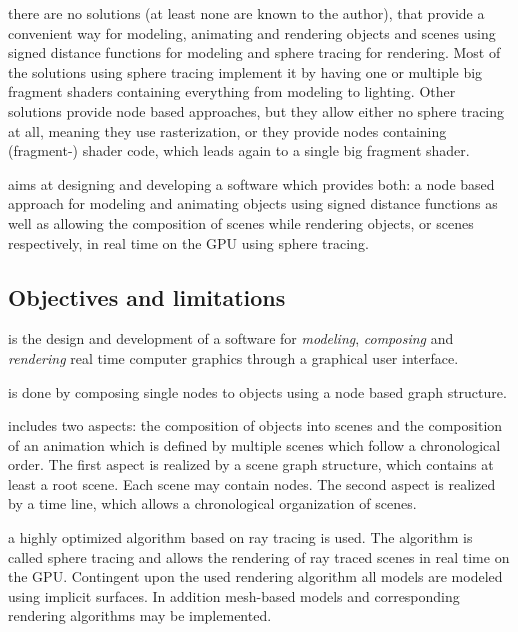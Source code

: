 \documentclass[%
    a4paper,    %
    justified,  %
    nobib,      %
    openany     %
]{tufte-book}
\begin{document}
 there are no solutions (at least none are
known to the author), that provide a convenient way for modeling, animating and
rendering objects and scenes using signed distance functions for modeling and
sphere tracing for rendering.
Most of the solutions using sphere tracing implement it by having one or
multiple big fragment shaders containing everything from modeling to lighting.
Other solutions provide node based approaches, but they allow either no sphere
tracing at all, meaning they use rasterization, or they provide nodes containing
(fragment-) shader code, which leads again to a single big fragment shader.

 aims at designing and developing a software which
provides both: a node based approach for modeling and animating objects using
signed distance functions as well as allowing the composition of scenes while
rendering objects, or scenes respectively, in real time on the GPU using sphere
tracing.

\subsection{Objectives and limitations}
\label{subsec:objectives}

 is the design and development of a
software for \textit{modeling}, \textit{composing} and \textit{rendering} real
time computer graphics through a graphical user interface.

 is done by composing single nodes to objects using a
node based graph structure.

 includes two aspects: the composition of objects into
scenes and the composition of an animation which is defined by multiple scenes
which follow a chronological order. The first aspect is realized by a scene
graph structure, which contains at least a root scene. Each scene may contain
nodes. The second aspect is realized by a time line, which allows a
chronological organization of scenes.

 a highly optimized algorithm based on ray tracing is
used. The algorithm is called sphere tracing and allows the rendering of ray
traced scenes in real time on the GPU. Contingent upon the used rendering
algorithm all models are modeled using implicit surfaces. In addition
mesh-based models and corresponding rendering algorithms may be implemented.
\end{document}
